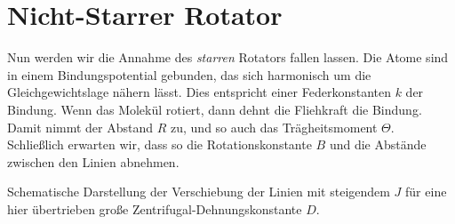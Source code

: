 \section{Nicht-Starrer Rotator}

Nun werden wir die Annahme des \emph{starren} Rotators fallen lassen. Die Atome sind in einem Bindungspotential gebunden, das sich harmonisch um die Gleichgewichtslage nähern lässt. Dies entspricht einer Federkonstanten $k$ der Bindung. Wenn das Molekül rotiert, dann dehnt die Fliehkraft die Bindung. Damit nimmt der Abstand $R$ zu, und so auch das Trägheitsmoment $\Theta$. Schließlich erwarten wir, dass so die Rotationskonstante $B$ und die Abstände zwischen den Linien abnehmen.


\begin{marginfigure}

\caption{Schematische Darstellung der Verschiebung der Linien mit steigendem $J$ für eine hier übertrieben große Zentrifugal-Dehnungskonstante $D$. \label{fig:rot_states_zentrifugal}}
\end{marginfigure}


